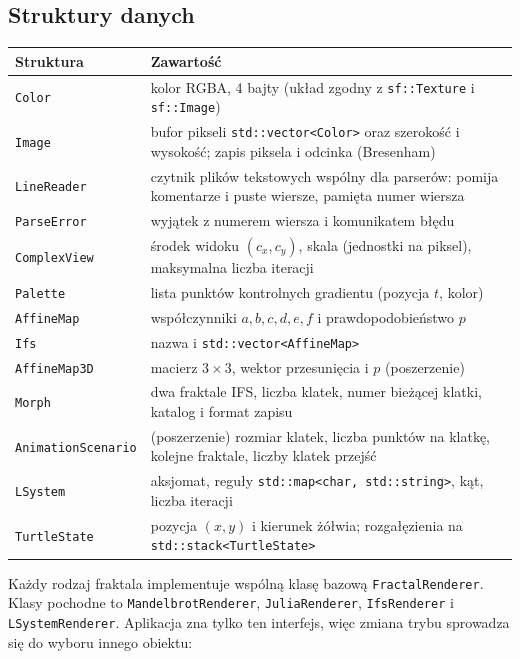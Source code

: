 \documentclass[11pt,a4paper]{article}
\newcommand{\kod}[1]{\texttt{#1}}
\begin{document}
\subsection{Struktury danych}

\begin{center}
\begin{tabularx}{\textwidth}{@{}l X@{}}
  \toprule
  Struktura & Zawartość \\
  \midrule
  \kod{Color} & kolor RGBA, 4 bajty (układ zgodny z \kod{sf::Texture}
                i \kod{sf::Image}) \\
  \kod{Image} & bufor pikseli \kod{std::vector<Color>} oraz szerokość
                i wysokość; zapis piksela i odcinka (Bresenham) \\
  \kod{LineReader} & czytnik plików tekstowych wspólny dla parserów: pomija
                     komentarze i puste wiersze, pamięta numer wiersza \\
  \kod{ParseError} & wyjątek z numerem wiersza i komunikatem błędu \\
  \kod{ComplexView} & środek widoku $(c_x, c_y)$, skala (jednostki na piksel),
                      maksymalna liczba iteracji \\
  \kod{Palette} & lista punktów kontrolnych gradientu (pozycja $t$, kolor) \\
  \kod{AffineMap} & współczynniki $a, b, c, d, e, f$ i prawdopodobieństwo $p$ \\
  \kod{Ifs} & nazwa i \kod{std::vector<AffineMap>} \\
  \kod{AffineMap3D} & macierz $3 \times 3$, wektor przesunięcia i $p$
                      (poszerzenie) \\
  \kod{Morph} & dwa fraktale IFS, liczba klatek, numer bieżącej klatki,
                katalog i format zapisu \\
  \kod{AnimationScenario} & (poszerzenie) rozmiar klatek, liczba punktów na
                            klatkę, kolejne fraktale, liczby klatek przejść \\
  \kod{LSystem} & aksjomat, reguły \kod{std::map<char, std::string>}, kąt,
                  liczba iteracji \\
  \kod{TurtleState} & pozycja $(x, y)$ i kierunek żółwia; rozgałęzienia
                      na \kod{std::stack<TurtleState>} \\
  \bottomrule
\end{tabularx}
\end{center}

Każdy rodzaj fraktala implementuje wspólną klasę bazową \kod{FractalRenderer}.
Klasy pochodne to \kod{MandelbrotRenderer}, \kod{JuliaRenderer},
\kod{IfsRenderer} i \kod{LSystemRenderer}. Aplikacja zna tylko ten interfejs,
więc zmiana trybu sprowadza się do wyboru innego obiektu:
\end{document}
